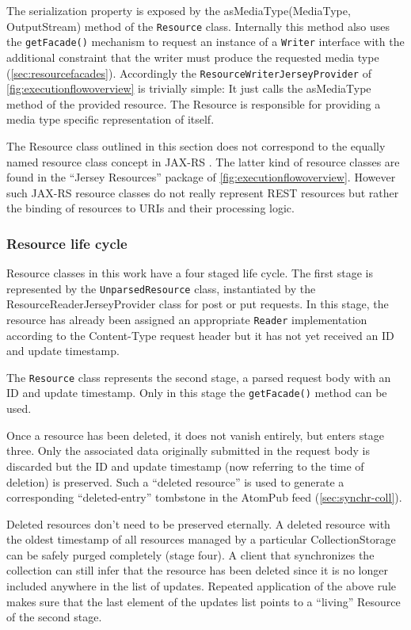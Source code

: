 \documentclass[11pt,a4paper,headsepline,twoside]{scrartcl}		%
\begin{document}
The serialization property is exposed by the asMediaType(MediaType,
OutputStream) method of the \lstinline:Resource: class. Internally this method
also uses the \lstinline:getFacade(): mechanism to request an instance of a
\lstinline:Writer: interface with the additional constraint that the writer must
produce the requested media type (\autoref{sec:resourcefacades}). Accordingly the
\lstinline:ResourceWriterJerseyProvider: of \autoref{fig:executionflowoverview}
is trivially simple: It just calls the asMediaType method of the provided
resource. The Resource is responsible for providing a media type specific
representation of itself.

The Resource class outlined in this section does not correspond to the equally
named resource class concept in JAX-RS \cite{JAX-RS1.1}. The latter kind of
resource classes are found in the ``Jersey Resources'' package of
\autoref{fig:executionflowoverview}. However such JAX-RS resource classes do not
really represent REST resources but rather the binding of resources to URIs and
their processing logic.

\subsubsection{Resource life cycle}
\label{sec:resource-life-cycle}


Resource classes in this work have a four staged life cycle. The first stage is
represented by the \lstinline:UnparsedResource: class, instantiated by the
ResourceReaderJerseyProvider class for post or put requests. In this stage, the
resource has already been assigned an appropriate \lstinline:Reader:
implementation according to the Content-Type request header but it has not yet
received an ID and update timestamp.

The \lstinline:Resource: class represents the second stage, a parsed request
body with an ID and update timestamp. Only in this stage the
\lstinline:getFacade(): method can be used.

Once a resource has been deleted, it does not vanish entirely, but enters stage
three. Only the associated data originally submitted in the request body is
discarded but the ID and update timestamp (now referring to the time of
deletion) is preserved. Such a ``deleted resource'' is used to generate a
corresponding ``deleted-entry'' tombstone in the AtomPub feed
(\autoref{sec:synchr-coll}).

Deleted resources don't need to be preserved eternally. A deleted resource with
the oldest timestamp of all resources managed by a particular CollectionStorage
can be safely purged completely (stage four). A client that synchronizes the
collection can still infer that the resource has been deleted since it is no
longer included anywhere in the list of updates. Repeated application of the
above rule makes sure that the last element of the updates list points to a
``living'' Resource of the second stage.
\end{document}
